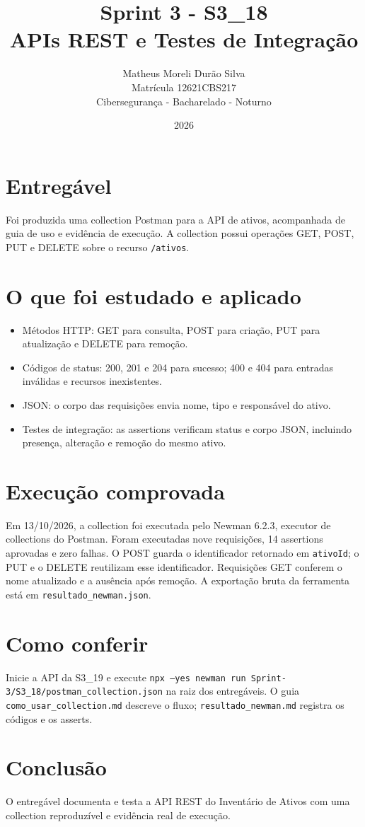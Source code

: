 \documentclass[12pt]{article}
\title{Sprint 3 - S3\_18\\APIs REST e Testes de Integração}
\author{Matheus Moreli Durão Silva\\Matrícula 12621CBS217\\Cibersegurança - Bacharelado - Noturno}
\date{2026}
\begin{document}
\maketitle

\section*{Entregável}
Foi produzida uma collection Postman para a API de ativos, acompanhada de guia de uso e evidência de execução. A collection possui operações GET, POST, PUT e DELETE sobre o recurso \texttt{/ativos}.

\section*{O que foi estudado e aplicado}
\begin{itemize}
\item Métodos HTTP: GET para consulta, POST para criação, PUT para atualização e DELETE para remoção.
\item Códigos de status: 200, 201 e 204 para sucesso; 400 e 404 para entradas inválidas e recursos inexistentes.
\item JSON: o corpo das requisições envia nome, tipo e responsável do ativo.
\item Testes de integração: as assertions verificam status e corpo JSON, incluindo presença, alteração e remoção do mesmo ativo.
\end{itemize}

\section*{Execução comprovada}
Em 13/10/2026, a collection foi executada pelo Newman 6.2.3, executor de collections do Postman. Foram executadas nove requisições, 14 assertions aprovadas e zero falhas. O POST guarda o identificador retornado em \texttt{ativoId}; o PUT e o DELETE reutilizam esse identificador. Requisições GET conferem o nome atualizado e a ausência após remoção. A exportação bruta da ferramenta está em \texttt{resultado\_newman.json}.

\section*{Como conferir}
Inicie a API da S3\_19 e execute \texttt{npx --yes newman run Sprint-3/S3\_18/postman\_collection.json} na raiz dos entregáveis. O guia \texttt{como\_usar\_collection.md} descreve o fluxo; \texttt{resultado\_newman.md} registra os códigos e os asserts.

\section*{Conclusão}
O entregável documenta e testa a API REST do Inventário de Ativos com uma collection reproduzível e evidência real de execução.
\end{document}
